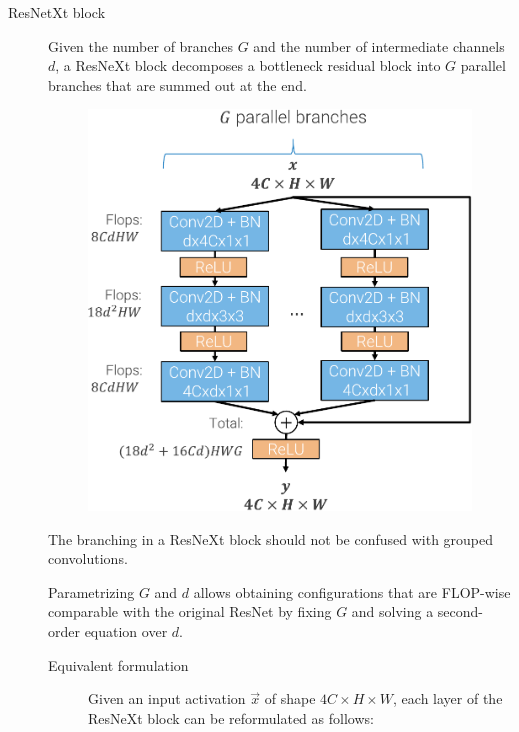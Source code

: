 \begin{description}
    \item[ResNetXt block] 
        Given the number of branches $G$ and the number of intermediate channels $d$, a ResNeXt block decomposes a bottleneck residual block into $G$ parallel branches that are summed out at the end.
        \begin{figure}[H]
            \centering
            \includegraphics[width=0.35\linewidth]{./img/_resnext_block.pdf}
        \end{figure}

        \begin{remark}
            The branching in a ResNeXt block should not be confused with grouped convolutions.
        \end{remark}

        \begin{remark}
            Parametrizing $G$ and $d$ allows obtaining configurations that are FLOP-wise comparable with the original ResNet by fixing $G$ and solving a second-order equation over $d$.
        \end{remark}

        \begin{description}
            \item[Equivalent formulation]
                Given an input activation $\vec{x}$ of shape $4C \times H \times W$, each layer of the ResNeXt block can be reformulated as follows:
\end{description}
\end{description}
